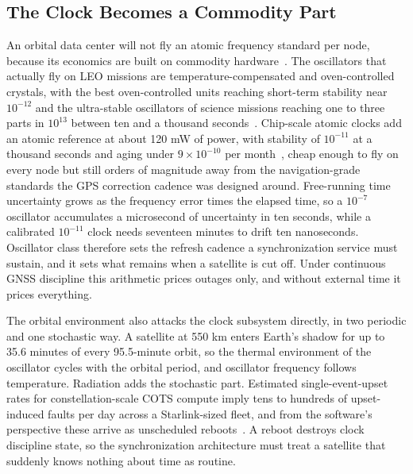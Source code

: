 \documentclass[twocolumn,10pt]{article}
\begin{document}
\subsection{The Clock Becomes a Commodity Part}\label{sec:break-clock}
An orbital data center will not fly an atomic frequency standard per node, because its economics are built on commodity hardware~\cite{denby2020,bhattacherjee2020}. The oscillators that actually fly on LEO missions are temperature-compensated and oven-controlled crystals, with the best oven-controlled units reaching short-term stability near $10^{-12}$ and the ultra-stable oscillators of science missions reaching one to three parts in $10^{13}$ between ten and a thousand seconds~\cite{wang2022}. Chip-scale atomic clocks add an atomic reference at about 120 mW of power, with stability of $10^{-11}$ at a thousand seconds and aging under $9\times10^{-10}$ per month~\cite{csac}, cheap enough to fly on every node but still orders of magnitude away from the navigation-grade standards the GPS correction cadence was designed around. Free-running time uncertainty grows as the frequency error times the elapsed time, so a $10^{-7}$ oscillator accumulates a microsecond of uncertainty in ten seconds, while a calibrated $10^{-11}$ clock needs seventeen minutes to drift ten nanoseconds. Oscillator class therefore sets the refresh cadence a synchronization service must sustain, and it sets what remains when a satellite is cut off. Under continuous GNSS discipline this arithmetic prices outages only, and without external time it prices everything.

The orbital environment also attacks the clock subsystem directly, in two periodic and one stochastic way. A satellite at 550 km enters Earth's shadow for up to 35.6 minutes of every 95.5-minute orbit, so the thermal environment of the oscillator cycles with the orbital period, and oscillator frequency follows temperature. Radiation adds the stochastic part. Estimated single-event-upset rates for constellation-scale COTS compute imply tens to hundreds of upset-induced faults per day across a Starlink-sized fleet, and from the software's perspective these arrive as unscheduled reboots~\cite{pfandzelter2023}. A reboot destroys clock discipline state, so the synchronization architecture must treat a satellite that suddenly knows nothing about time as routine.
\end{document}
